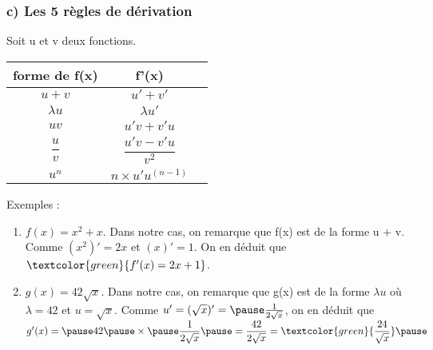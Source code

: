 \documentclass[t]{beamer}
\begin{document}
	\begin{frame}[label=pagebanale]
		\frametitle{c) Les 5 règles de dérivation}
		\pause
		Soit u et v deux fonctions.
		\begin{tabular}{|c|c|c|}
			\hline
				\textbf{forme de f(x)} & \textbf{f'(x)} \\
			\hline
				$u+v$ & $u' + v'$ \\
			\hline
				$\lambda u$ & $\lambda u'$ \\
			\hline
				$uv $ & $u'v +v'u$ \\
			\hline 
				$\dfrac{u}{v}$ & $\dfrac{u'v-v'u}{v^2}$ \\
			\hline
				$u^n$ & $n \times u' u^{(n-1)}$ \\
			\hline
		\end{tabular} 
		\pause
		\begin{block}{Exemples :}
			\begin{enumerate}
				\pause
				\item $f(x) = x^2 + x$. \pause Dans notre cas, on remarque que f(x) est de la forme u + v. \pause Comme $(x^2)' = 2x$ \pause et $(x)' = 1$. \pause On en déduit que $\textcolor{green}{f'(x) = 2x + 1}$. \pause
				\item $g(x) = 42 \sqrt{x}$. \pause Dans notre cas, on remarque que g(x) est de la forme $\lambda u$ \pause où $\lambda = 42$ \pause et $u = \sqrt{x}$. \pause Comme $u' = (\sqrt{x})' = \pause \frac{1}{2\sqrt{x}}$, \pause on en déduit que $g'(x) = \pause 42 \pause \times \pause \dfrac{1}{2\sqrt{x}} \pause = \dfrac{42}{2\sqrt{x}} = \textcolor{green}{\dfrac{24}{\sqrt{x}}} \pause $
			\end{enumerate}
		\end{block}
	\end{frame}
\end{document}
